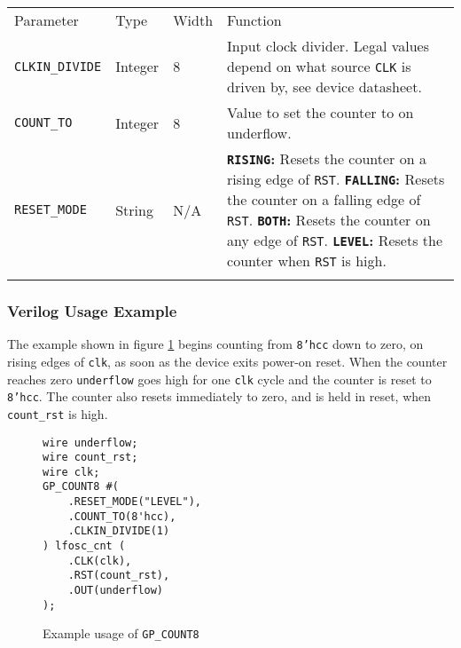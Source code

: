 \documentclass[11pt]{article}
\newcommand{\tokenstyle}[1]{\texttt{#1}}
\newcommand{\wirestyle}[1]{\texttt{#1}}
\newcommand{\valuestyle}[1]{\texttt{#1}}
\newcommand{\strvaluestyle}[1]{\valuestyle{\textquotedbl#1\textquotedbl}}
\newcommand{\strexamplestyle}[1]{\textbf{\strvaluestyle{#1}:}}
\newcommand{\datastyle}[1]{\texttt{#1}}
\newcommand{\whenstyle}[1]{{\fontseries{sb}\selectfont#1}}
\newcommand{\thinhline}{\Xhline{1\arrayrulewidth}}
\newcommand{\thickhline}{\Xhline{2.5\arrayrulewidth}}
\begin{document}
\begin{tabularx}{\textwidth}{lllX}
\thinhline
\whenstyle{Parameter} & \whenstyle{Type} & \whenstyle{Width} & \whenstyle{Function} \\
\thickhline
\tokenstyle{CLKIN\_DIVIDE} & Integer & 8 &
	Input clock divider. Legal values depend on what source \tokenstyle{CLK} is driven by, see device datasheet.\\
\thinhline
\tokenstyle{COUNT\_TO} & Integer & 8 & Value to set the counter to on underflow. \\
\thinhline
\tokenstyle{RESET\_MODE} & String & N/A &
	\strexamplestyle{RISING} Resets the counter on a rising edge of \tokenstyle{RST}. \newline
	\strexamplestyle{FALLING} Resets the counter on a falling edge of \tokenstyle{RST}. \newline
	\strexamplestyle{BOTH} Resets the counter on any edge of \tokenstyle{RST}. \newline
	\strexamplestyle{LEVEL} Resets the counter when \tokenstyle{RST} is high. \\
\thinhline
\end{tabularx}

\subsubsection{Verilog Usage Example}

The example shown in figure \ref{gp-count8-example} begins counting from \datastyle{8'hcc} down to zero,
on rising edges of \wirestyle{clk}, as soon as the device exits power-on reset. When the counter reaches zero
\wirestyle{underflow} goes high for one \wirestyle{clk} cycle and the counter is reset to \datastyle{8'hcc}.
The counter also resets immediately to zero, and is held in reset, when \wirestyle{count\_rst} is high.

\begin{figure}[h]
\begin{lstlisting}
wire underflow;
wire count_rst;
wire clk;
GP_COUNT8 #(
	.RESET_MODE("LEVEL"),
	.COUNT_TO(8'hcc),
	.CLKIN_DIVIDE(1)
) lfosc_cnt (
	.CLK(clk),
	.RST(count_rst),
	.OUT(underflow)
);
\end{lstlisting}
\caption{Example usage of \tokenstyle{GP\_COUNT8}}
\label{gp-count8-example}
\end{figure}

\end{document}
